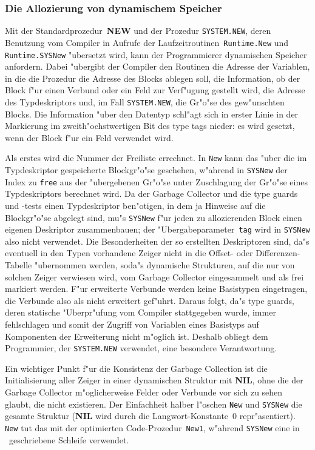 \subsubsection{Die Allozierung von dynamischem Speicher}

Mit der Standardprozedur~{\bf NEW} und der Prozedur {\tt SYSTEM.NEW},
deren Benutzung vom Compiler in Aufrufe der Laufzeitroutinen~{\tt Runtime.New}
und {\tt Runtime.SYSNew} "ubersetzt wird, kann der Programmierer
dynamischen Speicher anfordern.
Dabei "ubergibt der Compiler den Routinen die Adresse der Variablen, in die
die Prozedur die Adresse des Blocks ablegen soll, die Information, ob der
Block f"ur einen Verbund oder ein Feld zur Verf"ugung gestellt wird, die
Adresse des Typdeskriptors und, im Fall {\tt SYSTEM.NEW}, die Gr"o"se
des gew"unschten Blocks.
Die Information "uber den Datentyp schl"agt sich in erster Linie in der
Markierung im zweith"ochstwertigen Bit des type tags nieder: es wird
gesetzt, wenn der Block f"ur ein Feld verwendet wird.

Als erstes wird die Nummer der Freiliste errechnet.
In {\tt New} kann das "uber die im Typdeskriptor gespeicherte Blockgr"o"se
geschehen, w"ahrend in {\tt SYSNew} der Index zu {\tt free} aus der
"ubergebenen Gr"o"se unter Zuschlagung der Gr"o"se eines Typdeskriptors
berechnet wird.
Da der Garbage Collector und die type guards und -tests einen Typdeskriptor
ben"otigen, in dem ja Hinweise auf die Blockgr"o"se abgelegt sind, mu"s
{\tt SYSNew} f"ur jeden zu allozierenden Block einen eigenen Deskriptor
zusammenbauen; der "Ubergabeparameter~{\tt tag} wird in {\tt SYSNew}
also nicht verwendet.
Die Besonderheiten der so erstellten Deskriptoren sind, da"s eventuell in
den Typen vorhandene Zeiger nicht in die Offset- oder Differenzen-Tabelle
"ubernommen werden, soda"s dynamische Strukturen, auf die nur von solchen
Zeiger verwiesen wird, vom Garbage Collector eingesammelt und als frei
markiert werden.
F"ur erweiterte Verbunde werden keine Basistypen eingetragen,
die Verbunde also als nicht erweitert gef"uhrt.
Daraus folgt,
da"s type guards, deren statische "Uberpr"ufung vom Compiler stattgegeben
wurde, immer fehlschlagen und somit der Zugriff von Variablen eines
Basistyps auf Komponenten der Erweiterung nicht m"oglich ist.
Deshalb obliegt dem Programmier, der {\tt SYSTEM.NEW} verwendet, eine
besondere Verantwortung.

Ein wichtiger Punkt f"ur die Konsistenz der Garbage Collection ist
die Initialisierung aller Zeiger in einer dynamischen Struktur mit {\bf NIL},
ohne die der Garbage Collector m"oglicherweise Felder oder Verbunde vor
sich zu sehen glaubt, die nicht existieren.
Der Einfachheit halber l"oschen {\tt New} und {\tt SYSNew} die
gesamte Struktur ({\bf NIL} wird durch die Langwort-Konstante~0 repr"asentiert).
{\tt New} tut das mit der optimierten Code-Prozedur~{\tt New1}, w"ahrend
{\tt SYSNew} eine in \oberon\ geschriebene Schleife verwendet.

